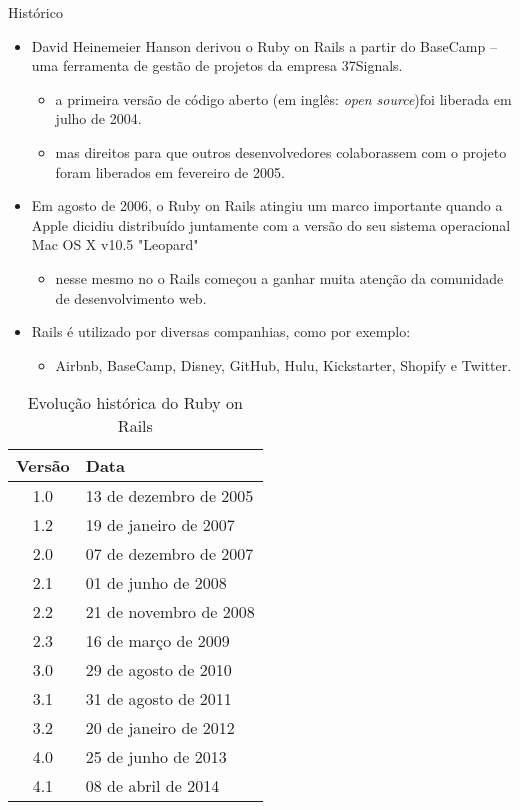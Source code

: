 \begin{frame}{Histórico}
  \begin{itemize}
    \item David Heinemeier Hanson \alert{derivou} o Ruby on Rails a partir do BaseCamp --
      uma ferramenta de gestão de projetos da empresa 37Signals.
    \begin{itemize}
	\item a primeira versão de código aberto (em inglês: \textit{open source})foi liberada em 
	  julho de 2004.
	\item mas direitos para que outros desenvolvedores \alert{colaborassem} com o projeto foram liberados
	  em fevereiro de 2005.
    \end{itemize}
    \item Em agosto de 2006, o Ruby on Rails atingiu um \alert{marco importante} quando a Apple dicidiu
      distribuído juntamente com a versão do seu sistema operacional Mac OS X v10.5 "Leopard"
    \begin{itemize}
     \item nesse mesmo no o Rails começou a ganhar muita atenção da comunidade de desenvolvimento web.
    \end{itemize}
    \item Rails é utilizado por diversas companhias, como por exemplo:
    \begin{itemize}
     \item Airbnb, BaseCamp, Disney, GitHub, Hulu, Kickstarter, Shopify e Twitter.
    \end{itemize}

  \end{itemize} 
  \begin{table}\centering\scriptsize
      \begin{tabular}{@{}cl@{}}\toprule
	\textbf{Versão} & \textbf{Data}	\\ \midrule
	1.0 & 13 de dezembro de 2005	\\
	1.2 & 19 de janeiro de 2007	\\
	2.0 & 07 de dezembro de 2007	\\
	2.1 & 01 de junho de 2008	\\
	2.2 & 21 de novembro de 2008	\\ 
	2.3 & 16 de março de 2009	\\
	3.0 & 29 de agosto de 2010	\\
	3.1 & 31 de agosto de 2011	\\
	3.2 & 20 de janeiro de 2012	\\
	4.0 & 25 de junho de 2013	\\
	4.1 & 08 de abril de 2014	\\ \bottomrule
      \end{tabular}
      \caption{Evolução histórica do Ruby on Rails}
    \end{table}  
\end{frame}

